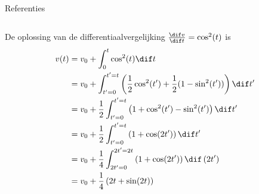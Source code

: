 \begin{frame}[fragile,t]{Referenties}
    \begin{columns}[t]
        \begin{column}{0.5\textwidth}%
            {%
            \begin{adjustbox}{frame=1pt 10pt,valign=t}%
                \begin{minipage}{\textwidth-22pt}
                        {\tiny De oplossing van de differentiaalvergelijking $ \frac{\dif v}{\dif t} = \cos^2(t) $
                            is
                            \begin{align*}
                                v(t) & = v_0 + \int_{0}^{t}\cos^2(t)\dif t                                                          \\
                                     & = v_0 + \int_{t'=0}^{t'=t}\left(\frac{1}{2}\cos^2(t')+\frac{1}{2}(1-\sin^2(t'))\right)\dif t' \\
                                     & = v_0 + \frac{1}{2}\int_{t'=0}^{t'=t}\left(1+\cos^2(t')-\sin^2(t')\right)\dif t'             \\
                                     & = v_0 + \frac{1}{2}\int_{t'=0}^{t'=t}\left(1+\cos(2t')\right)\dif t'                         \\
                                     & = v_0 + \frac{1}{4}\int_{2t'=0}^{2t'=2t}\left(1+\cos(2t')\right)\dif\, (2t')                 \\
                                     & = v_0 + \frac{1}{4}\left(2t+\sin(2t)\right)                                                  \\

\end{align*}}
\end{minipage}
\end{adjustbox}}
\end{column}
\end{columns}
\end{frame}
